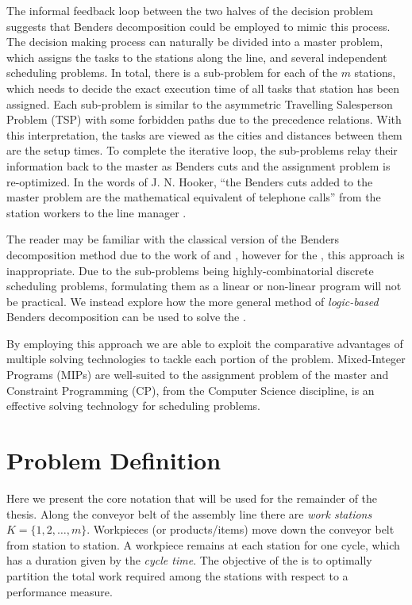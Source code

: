 The informal feedback loop between the two halves of the
decision problem suggests that Benders decomposition could be
employed to mimic this process.
The decision making process can naturally be divided
into a master problem, which assigns the tasks
to the stations along the line,
and several independent scheduling problems.
In total, there is a sub-problem
for each of the $m$ stations, which needs to
decide the exact execution time of all tasks
that station has been assigned.
Each sub-problem is similar to the asymmetric
Travelling Salesperson Problem (TSP)
with some forbidden paths due to the precedence
relations.
With this interpretation, the tasks are viewed as the 
cities and distances between them are the setup times.
To complete the iterative loop, the sub-problems
relay their information back to the master as
Benders cuts and the assignment problem is re-optimized.
In the words of J. N. Hooker,
``the Benders cuts added to the master problem are
the mathematical equivalent of telephone calls''
from the station workers to the line manager \cite{Hooker2007}.

The reader may be familiar with the classical version
of the Benders decomposition method due to the 
work of  and ,
however for the \sua{}, this approach is inappropriate.
Due to the sub-problems being highly-combinatorial discrete scheduling
problems, formulating them as a linear or non-linear program
will not be practical.
We instead explore how the more general method of \emph{logic-based}
Benders decomposition can be used to solve the .

By employing this approach we are able to exploit the comparative
advantages of multiple solving technologies to tackle each
portion of the problem.
Mixed-Integer Programs (MIPs) are well-suited to the assignment
problem of the master and Constraint Programming (CP), from 
the Computer Science discipline, is an effective solving technology
for scheduling problems.

\section{Problem Definition}
\label{sec:intro:probDef}
Here we present the core notation that will be used for the
remainder of the thesis.
Along the conveyor belt of the assembly line
there are \emph{work stations} $K=\{1,2,\ldots,m\}$.
Workpieces (or products/items) move down the 
conveyor belt from station to station.
A workpiece remains at each station for 
one cycle, which has a duration given by the \emph{cycle time}.
The objective of the \albp{} is to optimally partition
the total work required among the stations with respect to
a performance measure.

